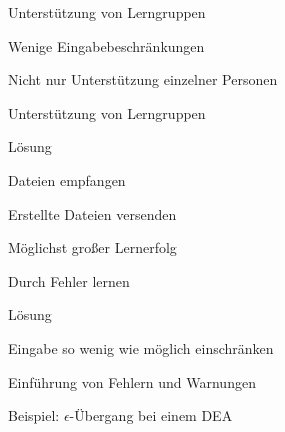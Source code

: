 



{
    \begin{itemgroup}{}
	\item Unterstützung von Lerngruppen
	\item Wenige Eingabebeschränkungen
	\end{itemgroup}

    \vfill{}
}


{
    \begin{itemgroup}{}
	\item Nicht nur Unterstützung einzelner Personen
	\item Unterstützung von Lerngruppen
    \end{itemgroup}

    \begin{itemgroup}{Lösung}
	\item Dateien empfangen
	\item Erstellte Dateien versenden
	\end{itemgroup}
    
    \vfill{}
}


{
    \begin{itemgroup}{}
	\item Möglichst großer Lernerfolg
	\item Durch Fehler lernen
    \end{itemgroup}

    \begin{itemgroup}{Lösung}
	\item Eingabe so wenig wie möglich einschränken
	\item Einführung von Fehlern und Warnungen
	\item Beispiel: $\epsilon$-Übergang bei einem DEA
	\end{itemgroup}
    
    \vfill{}
}


